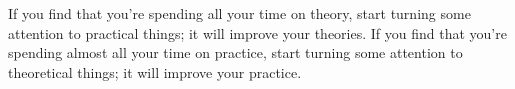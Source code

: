 If you find that you're spending all your time on theory, start turning some attention to practical things; it will improve your theories. If you find that you're spending almost all your time on practice, start turning some attention to theoretical things; it will improve your practice.